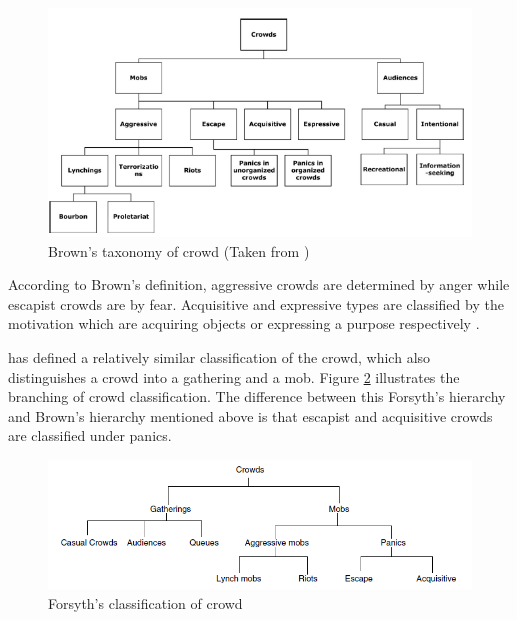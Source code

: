 \begin{figure}[htbp!] 
	\centering    
	\includegraphics[width=1.0\textwidth]{BrownCrowdType}
	\caption{Brown's taxonomy of crowd (Taken from \citet{Pelechano2008})}
	\label{fig:brownCrowdType}
\end{figure}


According to Brown’s definition, aggressive crowds are determined by anger while escapist crowds are by fear. Acquisitive and expressive types are classified by the motivation which are acquiring objects or expressing a purpose respectively \citep{Durupinar2010}.

\citet{Forsyth2009} has defined a relatively similar classification of the crowd, which also distinguishes a crowd into a gathering and a mob. Figure \ref{fig:forsythCrowdType} illustrates the branching of crowd classification. The difference between this Forsyth’s hierarchy and Brown’s hierarchy mentioned above is that escapist and acquisitive crowds are classified under panics. 

\begin{figure}[htbp!] 
	\centering    
	\includegraphics[width=1.0\textwidth]{ForsythCrowdType}
	\caption{Forsyth's classification of crowd}
	\label{fig:forsythCrowdType}
\end{figure}

